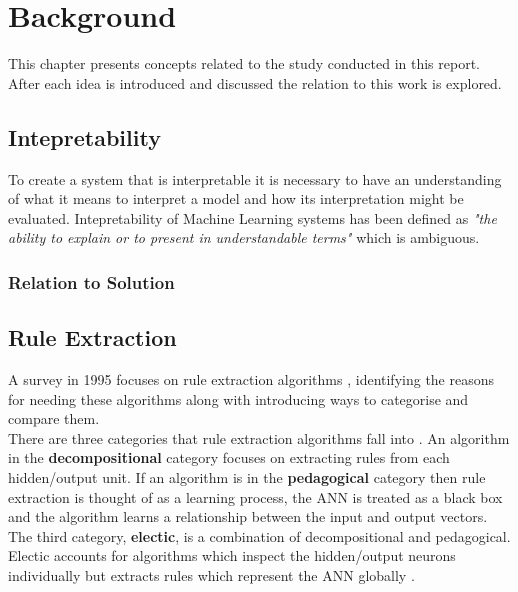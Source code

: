 \chapter{Background}\label{C:backgroundsurvey}
This chapter presents concepts related to the study conducted in this report. After each idea is introduced and discussed the relation to this work is explored.

\section{Intepretability}
To create a system that is interpretable it is necessary to have an understanding of what it means to interpret a model and how its interpretation might be evaluated. Intepretability of Machine Learning systems has been defined as \textit{"the ability to explain or to present in understandable terms"} \cite{doshi2017towards} which is ambiguous.\\



\subsection{Relation to Solution}



\section{Rule Extraction}

A survey in 1995 focuses on rule extraction algorithms \cite{andrews1995survey}, identifying the reasons for needing these algorithms along with introducing ways to categorise and compare them.\\

There are three categories that rule extraction algorithms fall into \cite{andrews1995survey}. An algorithm in the \textbf{decompositional} category focuses on extracting rules from each hidden/output unit. If an algorithm is in the \textbf{pedagogical} category then rule extraction is thought of as a learning process, the ANN is treated as a black box and the algorithm learns a relationship between the input and output vectors. The third category, \textbf{electic}, is a combination of decompositional and pedagogical. Electic accounts for algorithms which inspect the hidden/output neurons individually but extracts rules which represent the ANN globally \cite{tickle1998truth}.\\

